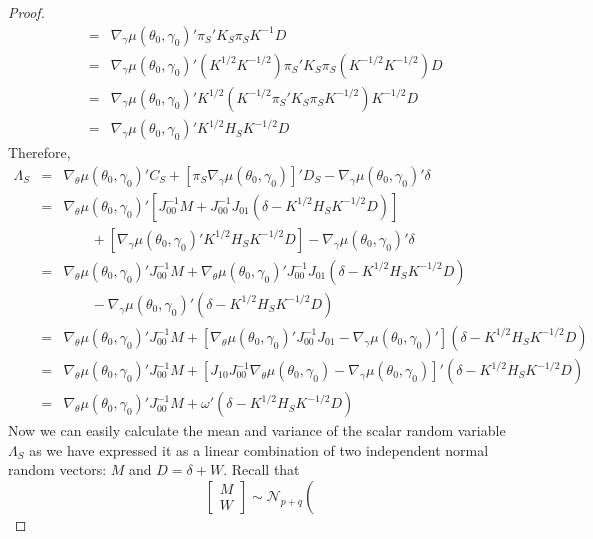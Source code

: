 \documentclass[12pt]{article}
\theoremstyle{definition}
\begin{document}
\begin{proof}
\begin{eqnarray*}
		&=&\nabla_\gamma \mu(\theta_0, \gamma_0)'\pi_S'  K_S \pi_S
 K^{-1}D\\
		&=&\nabla_\gamma \mu(\theta_0, \gamma_0)' \left(K^{1/2}K^{-1/2}\right)\pi_S'  K_S \pi_S
 \left(K^{-1/2}K^{-1/2}\right)D\\
		&=&\nabla_\gamma \mu(\theta_0, \gamma_0)' K^{1/2}\left(K^{-1/2}\pi_S'  K_S \pi_S
K^{-1/2}\right)K^{-1/2}D\\
		&=&\nabla_\gamma \mu(\theta_0, \gamma_0)' K^{1/2}H_S K^{-1/2}D
\end{eqnarray*}
Therefore,
	\begin{eqnarray*}
		\Lambda_S &=& \nabla_{\theta}\mu(\theta_0, \gamma_0)'C_S + \left[\pi_S\nabla_\gamma \mu(\theta_0, \gamma_0)\right]'D_S - \nabla_\gamma \mu(\theta_0,\gamma_0)'\delta\\
			&=& \nabla_{\theta}\mu(\theta_0, \gamma_0)'\left[J_{00}^{-1}M + J_{00}^{-1}J_{01}\left(\delta -  K^{1/2}H_SK^{-1/2}D\right)\right]\\
			&& \;\;\;\;\;\;\; + \left[\nabla_\gamma \mu(\theta_0, \gamma_0)' K^{1/2}H_S K^{-1/2}D\right] - \nabla_\gamma \mu(\theta_0,\gamma_0)'\delta\\
			&=&\nabla_{\theta}\mu(\theta_0, \gamma_0)'J_{00}^{-1}M + \nabla_{\theta}\mu(\theta_0, \gamma_0)' J_{00}^{-1}J_{01}\left(\delta -  K^{1/2}H_SK^{-1/2}D\right)\\
			&&\;\;\;\;\;\;\; - \nabla_\gamma \mu(\theta_0, \gamma_0)' \left(\delta -K^{1/2}H_S K^{-1/2}D\right)\\
			&=& \nabla_{\theta}\mu(\theta_0, \gamma_0)'J_{00}^{-1}M + \left[\nabla_{\theta}\mu(\theta_0, \gamma_0)' J_{00}^{-1}J_{01} - \nabla_\gamma \mu(\theta_0, \gamma_0)'\right]\left(\delta -K^{1/2}H_S K^{-1/2}D\right)\\
			&=& \nabla_{\theta}\mu(\theta_0, \gamma_0)'J_{00}^{-1}M + \left[J_{10}J_{00}^{-1}\nabla_{\theta}\mu(\theta_0, \gamma_0) - \nabla_\gamma \mu(\theta_0, \gamma_0)\right]'\left(\delta -K^{1/2}H_S K^{-1/2}D\right)\\
			&=& \nabla_{\theta}\mu(\theta_0, \gamma_0)'J_{00}^{-1}M + \omega'\left(\delta -K^{1/2}H_S K^{-1/2}D\right)
	\end{eqnarray*}
Now we can easily calculate the mean and variance of the scalar random variable $\Lambda_S$ as we have expressed it as a linear combination of two independent normal random vectors: $M$ and $D=\delta + W$. Recall that
	$$
	\left[\begin{array}{c}
		M\\
		W
	\end{array}\right] \sim \mathcal{N}_{p+q}\left(
$$
\end{proof}
\end{document}
